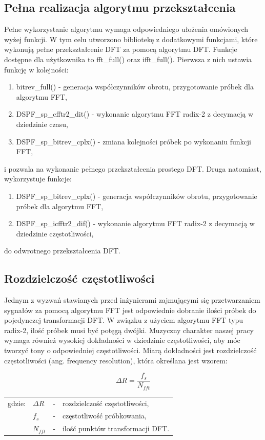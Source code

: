 \subsection{Pełna realizacja algorytmu przekształcenia}
Pełne wykorzystanie algorytmu wymaga odpowiedniego ułożenia omówionych wyżej funkcji. W tym celu utworzono bibliotekę z dodatkowymi funkcjami, które wykonują pełne przekształcenie DFT za pomocą algorytmu DFT. Funkcje dostępne dla użytkownika to fft\_full() oraz ifft\_full(). Pierwsza z nich ustawia funkcję w kolejności:
\begin{enumerate}
	\item bitrev\_full() - generacja współczynników obrotu, przygotowanie próbek dla algorytmu FFT,
	\item DSPF\_sp\_cfftr2\_dit() - wykonanie algorytmu FFT radix-2 z decymacją w dziedzinie czasu,
	\item DSPF\_sp\_bitrev\_cplx() - zmiana kolejności próbek po wykonaniu funkcji FFT,
\end{enumerate}
i pozwala na wykonanie pełnego przekształcenia prostego DFT. Druga natomiast, wykorzystuje funkcje:
\begin{enumerate}
	\item DSPF\_sp\_bitrev\_cplx() - generacja współczynników obrotu, przygotowanie próbek dla algorytmu FFT,
	\item DSPF\_sp\_icfftr2\_dif() - wykonanie algorytmu FFT radix-2 z decymacją w dziedzinie częstotliwości,
\end{enumerate}
do odwrotnego przekształcenia DFT.

\subsection{Rozdzielczość częstotliwości}
Jednym z wyzwań stawianych przed inżynierami zajmującymi się przetwarzaniem sygnałów za pomocą algorytmu FFT jest odpowiednie dobranie ilości próbek do pojedynczej transformacji DFT. W związku z użyciem algorytmu FFT typu radix-2, ilość próbek musi być potęgą dwójki. Muzyczny charakter naszej pracy wymaga również wysokiej dokładności w dziedzinie częstotliwości, aby móc tworzyć tony o odpowiedniej częstotliwości. Miarą dokładności jest rozdzielczość częstotliwości (ang. frequency resolution), która określana jest wzorem:

\begin{equation} \label{equ:fft_resol}
\Delta R = \frac{f_{s}}{N_{fft}}
\end{equation}
\begin{tabular}{ l l l l}
	gdzie: 	&	$\Delta R$ & - &  rozdzielczość częstotliwości, \\
	&	$f_{s}$ & - &  częstotliwość próbkowania, \\
	&   $N_{fft}$ &  - & ilość punktów transformacji DFT. \\
\end{tabular}


